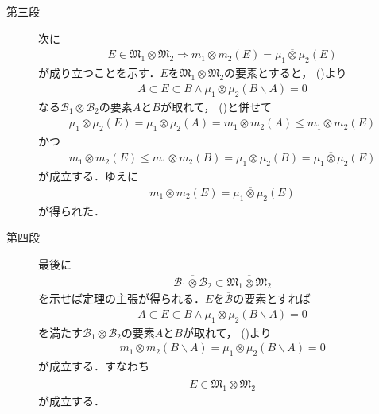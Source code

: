 \begin{prf}
\begin{description}
				\item[第三段]
					次に
					\begin{align}
						E \in \mathfrak{M}_1 \otimes \mathfrak{M}_2
						\Longrightarrow m_1 \otimes m_2(E) = \overline{\mu_1 \otimes \mu_2}(E)
					\end{align}
					が成り立つことを示す．$E$を$\mathfrak{M}_1 \otimes \mathfrak{M}_2$の要素とすると，
					()より
					\begin{align}
						A \subset E \subset B \wedge \mu_1 \otimes \mu_2(B \backslash A) = 0
						\label{eq:thm_product_space_of_complete_measure_space_3}
					\end{align}
					なる$\mathcal{B}_1 \otimes \mathcal{B}_2$の要素$A$と$B$が取れて，
					()と併せて
					\begin{align}
						\overline{\mu_1 \otimes \mu_2}(E)
						= \mu_1 \otimes \mu_2(A)
						= m_1 \otimes m_2(A)
						\leq m_1 \otimes m_2(E)
					\end{align}
					かつ
					\begin{align}
						m_1 \otimes m_2(E)
						\leq m_1 \otimes m_2(B)
						= \mu_1 \otimes \mu_2(B)
						= \overline{\mu_1 \otimes \mu_2}(E)
					\end{align}
					が成立する．ゆえに
					\begin{align}
						m_1 \otimes m_2(E) = \overline{\mu_1 \otimes \mu_2}(E)
					\end{align}
					が得られた．
					
				\item[第四段]
					最後に
					\begin{align}
						\overline{\mathcal{B}_1 \otimes \mathcal{B}_2} \subset 
						\overline{\mathfrak{M}_1 \otimes \mathfrak{M}_2}
					\end{align}
					を示せば定理の主張が得られる．$E$を$\overline{\mathcal{B}}$の要素とすれば
					\begin{align}
						A \subset E \subset B \wedge \mu_1 \otimes \mu_2(B \backslash A) = 0
					\end{align}
					を満たす$\mathcal{B}_1 \otimes \mathcal{B}_2$の要素$A$と$B$が取れて，
					()より
					\begin{align}
						m_1 \otimes m_2(B \backslash A) = \mu_1 \otimes \mu_2(B \backslash A) = 0
					\end{align}
					が成立する．すなわち
					\begin{align}
						E \in \overline{\mathfrak{M}_1 \otimes \mathfrak{M}_2}
					\end{align}
					が成立する．
					\QED
			\end{description}
		\end{prf}